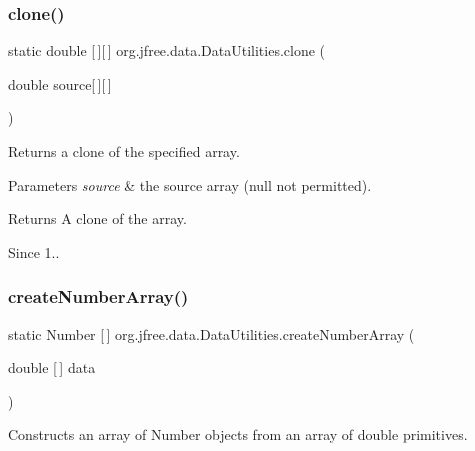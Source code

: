 \subsubsection{\texorpdfstring{clone()}{clone()}}
{\footnotesize\ttfamily static double \mbox{[}$\,$\mbox{]}\mbox{[}$\,$\mbox{]} org.\+jfree.\+data.\+Data\+Utilities.\+clone (\begin{DoxyParamCaption}\item[{double}]{source\mbox{[}$\,$\mbox{]}\mbox{[}$\,$\mbox{]} }\end{DoxyParamCaption})\hspace{0.3cm}{\ttfamily [static]}}

Returns a clone of the specified array.


\begin{DoxyParams}{Parameters}
{\em source} & the source array ({\ttfamily null} not permitted).\\
\hline
\end{DoxyParams}
\begin{DoxyReturn}{Returns}
A clone of the array.
\end{DoxyReturn}
\begin{DoxySince}{Since}
1.. 
\end{DoxySince}
\mbox{\label{classorg_1_1jfree_1_1data_1_1_data_utilities_abb1c117ab91d584100036285907f0381}} 
\subsubsection{\texorpdfstring{create\+Number\+Array()}{createNumberArray()}}
{\footnotesize\ttfamily static Number \mbox{[}$\,$\mbox{]} org.\+jfree.\+data.\+Data\+Utilities.\+create\+Number\+Array (\begin{DoxyParamCaption}\item[{double \mbox{[}$\,$\mbox{]}}]{data }\end{DoxyParamCaption})\hspace{0.3cm}{\ttfamily [static]}}

Constructs an array of {\ttfamily Number} objects from an array of {\ttfamily double} primitives.


